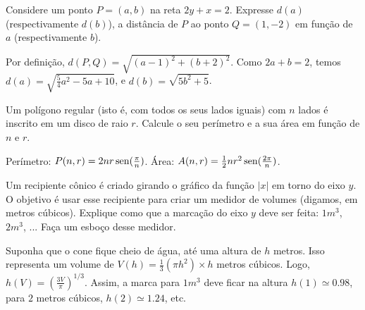 \begin{exo}
 Considere um ponto $P=(a,b)$ na reta $2y+x=2$.
Expresse $d(a)$ (respectivamente $d(b)$), 
a distância de $P$ ao ponto $Q=(1,-2)$ em função de $a$ (respectivamente $b$).
\begin{sol}
 Por definição, $d(P,Q)=\sqrt{(a-1)^2+(b+2)^2}$.
Como $2a+b=2$, temos $d(a)=\sqrt{\tfrac54a^2-5a+10}$, e $d(b)=\sqrt{5b^2+5}$.
\end{sol}
\end{exo}

\begin{exo}
Um polígono regular (isto é, com todos os seus lados iguais) com $n$ lados é inscrito em um
disco de raio $r$. Calcule o seu perímetro e a sua área em função de $n$ e $r$.
\begin{sol}
Perímetro: $P(n,r)=2nr\operatorname{sen} (\tfrac{\pi}{n})$.
Área: $A(n,r)=\tfrac12 nr^2\operatorname{sen}(\tfrac{2\pi}{n})$.
\end{sol}
\end{exo}

\begin{exo}
Um recipiente cônico é criado girando o gráfico da função $|x|$ em torno do
eixo $y$.
 O objetivo é usar esse recipiente para criar um medidor de volumes (digamos, em metros
cúbicos). Explique como que a marcação do eixo $y$ deve ser feita: $1m^3$, $2m^3$, ...
Faça um esboço desse medidor.
\begin{sol}
Suponha que o cone fique cheio de água, até uma altura de $h$ metros. Isso representa um
volume de 
$V(h)=\tfrac13 (\pi h^2)\times h$ metros cúbicos. Logo, $h(V)=(\tfrac{3 V}{\pi})^{1/3}$.
Assim, a marca para $1m^3$ deve ficar na altura $h(1)\simeq 0.98$, para $2$ metros
cúbicos, $h(2)\simeq 1.24$, etc.
\begin{center}
\begin{bmlimage}\end{bmlimage}
\end{center}

\end{sol}
\end{exo}


